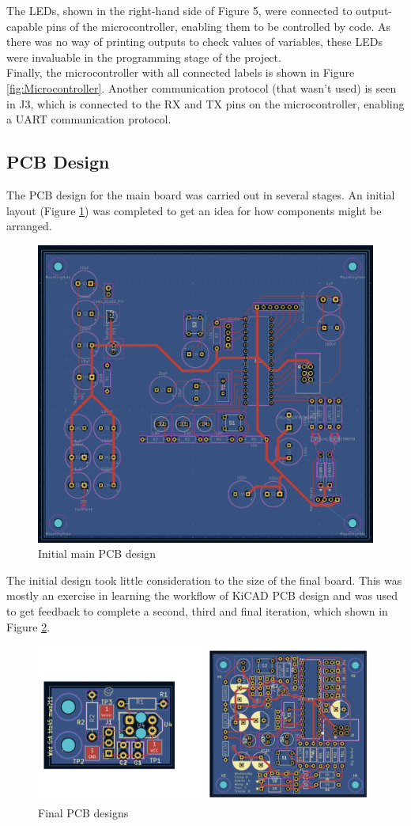 The LEDs, shown in the right-hand side of Figure 5, were connected to output-capable pins of the microcontroller, enabling them to be controlled by code. As there was no way of printing outputs to check values of variables, these LEDs were invaluable in the programming stage of the project. 
\\

Finally, the microcontroller with all connected labels is shown in Figure \ref{fig:Microcontroller}. Another communication protocol (that wasn’t used) is seen in J3, which is connected to the RX and TX pins on the microcontroller, enabling a UART communication protocol.  
 
\subsection{PCB Design}
The PCB design for the main board was carried out in several stages. An initial layout (Figure \ref{fig:initpcb}) was completed to get an idea for how components might be arranged. 

\begin{figure}[H]
    \centering
    \includegraphics[width=0.4\linewidth]{REPORT/initpcb.png}
    \caption{Initial main PCB design}
    \label{fig:initpcb}
\end{figure}

The initial design took little consideration to the size of the final board. This was mostly an exercise in learning the workflow of KiCAD PCB design and was used to get feedback to complete a second, third and final iteration, which shown in Figure \ref{fig:finalpcb}. 

\begin{figure}[H]
    \centering
    \includegraphics[width=0.7\linewidth]{REPORT/Screenshot 2024-10-20 at 2.37.22 PM.png}
    \caption{Final PCB designs}
    \label{fig:finalpcb}
\end{figure}

